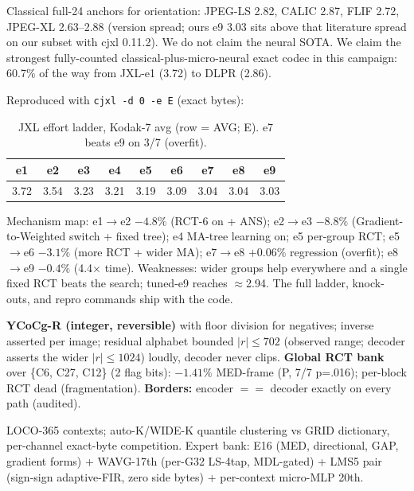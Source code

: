 \documentclass[smallabstract,smallcaptions]{dccpaper}
\begin{document}
Classical full-24 anchors for orientation: JPEG-LS 2.82, CALIC 2.87, FLIF
2.72, JPEG-XL 2.63--2.88 (version spread; ours e9 3.03 sits above that
literature spread on our subset with cjxl 0.11.2). We do not claim the neural SOTA. We claim the
strongest fully-counted classical-plus-micro-neural exact codec in this
campaign: 60.7\% of the way from JXL-e1 (3.72) to DLPR (2.86).


Reproduced with \texttt{cjxl -d 0 -e E} (exact bytes):

\begin{table}[h]
\centering\footnotesize
\caption{JXL effort ladder, Kodak-7 avg (row = AVG; E). e7 beats e9 on 3/7 (overfit).}
\label{tab:jxl}
{\setlength{\tabcolsep}{4pt}\begin{tabular}{@{}ccccccccc@{}}
\toprule
e1 & e2 & e3 & e4 & e5 & e6 & e7 & e8 & e9 \\
\midrule
3.72 & 3.54 & 3.23 & 3.21 & 3.19 & 3.09 & 3.04 & 3.04 & 3.03 \\
\bottomrule
\end{tabular}}
\end{table}

Mechanism map: e1$\to$e2 $-4.8\%$ (RCT-6 on + ANS); e2$\to$e3 $-8.8\%$
(Gradient-to-Weighted switch + fixed tree); e4 MA-tree learning on; e5 per-group
RCT; e5$\to$e6 $-3.1\%$ (more RCT + wider MA); e7$\to$e8 $+0.06\%$
regression (overfit); e8$\to$e9 $-0.4\%$ (4.4$\times$ time). Weaknesses: wider groups help everywhere and a single fixed RCT beats the
search; tuned-e9 reaches $\approx$2.94. The full ladder, knock-outs, and repro commands ship with the code.


\textbf{YCoCg-R (integer, reversible)} with floor division for negatives;
inverse asserted per image; residual alphabet bounded $|r|\le702$ (observed
range; decoder asserts the wider $|r|\le1024$) loudly, decoder never clips. \textbf{Global RCT bank} over
\{C6, C27, C12\} (2 flag bits): $-1.41\%$ MED-frame (P, 7/7 p=.016); per-block
RCT dead (fragmentation). \textbf{Borders:} encoder $==$ decoder exactly
on every path (audited).

LOCO-365 contexts; auto-K/WIDE-K quantile clustering vs GRID dictionary,
per-channel exact-byte competition. Expert bank:
E16 (MED, directional, GAP, gradient forms) + WAVG-17th (per-G32 LS-4tap,
MDL-gated) + LMS5 pair
(sign-sign adaptive-FIR, zero side bytes) + per-context micro-MLP 20th.
\end{document}
